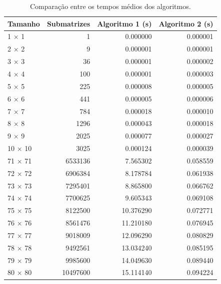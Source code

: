 \begin{table}
\caption{Comparação entre os tempos médios dos algoritmos.}
\label{tab:comparacao}
\begin{tabular}{lrrr}
\toprule
Tamanho & Submatrizes & Algoritmo 1 (s) & Algoritmo 2 (s) \\
\midrule
1 × 1 & 1 & 0.000000 & 0.000001 \\
2 × 2 & 9 & 0.000001 & 0.000001 \\
3 × 3 & 36 & 0.000001 & 0.000002 \\
4 × 4 & 100 & 0.000001 & 0.000003 \\
5 × 5 & 225 & 0.000008 & 0.000005 \\
6 × 6 & 441 & 0.000005 & 0.000006 \\
7 × 7 & 784 & 0.000018 & 0.000010 \\
8 × 8 & 1296 & 0.000043 & 0.000018 \\
9 × 9 & 2025 & 0.000077 & 0.000027 \\
10 × 10 & 3025 & 0.000124 & 0.000039 \\
71 × 71 & 6533136 & 7.565302 & 0.058559 \\
72 × 72 & 6906384 & 8.178784 & 0.061938 \\
73 × 73 & 7295401 & 8.865800 & 0.066762 \\
74 × 74 & 7700625 & 9.605343 & 0.069108 \\
75 × 75 & 8122500 & 10.376290 & 0.072771 \\
76 × 76 & 8561476 & 11.210180 & 0.076945 \\
77 × 77 & 9018009 & 12.096290 & 0.080829 \\
78 × 78 & 9492561 & 13.034240 & 0.085195 \\
79 × 79 & 9985600 & 14.049630 & 0.089440 \\
80 × 80 & 10497600 & 15.114140 & 0.094224 \\
\bottomrule
\end{tabular}
\end{table}

